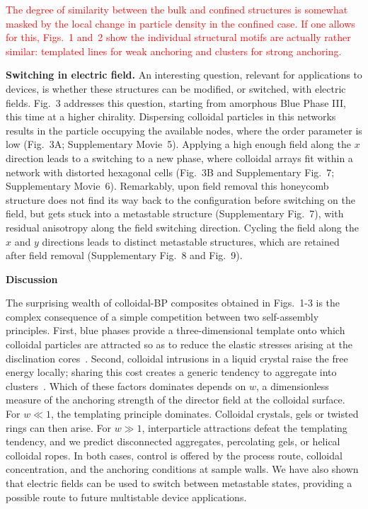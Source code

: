 \documentclass[12pt]{article}
\begin{document}
\textcolor{red}{
The degree of similarity between
the bulk and confined structures is somewhat masked by the local
change in particle density in the confined case. If one allows for
this, Figs.~1 and~2 show the individual structural motifs are actually
rather similar: templated lines for weak anchoring and clusters for
strong anchoring.
}

\medskip
\noindent
\textbf{Switching in electric field.}
An interesting question, relevant for applications to devices, is whether 
these structures can be modified, or switched, with electric fields.
Fig.~3 addresses this question, starting from amorphous Blue Phase III,
this time at a higher chirality. Dispersing colloidal particles in this networks
results in the particle occupying the available nodes, where the order
parameter is low (Fig.~3A; Supplementary Movie~5). Applying a high enough
field 
along the $x$ direction leads to a switching to a new phase, where colloidal 
arrays fit within a network with distorted hexagonal cells (Fig.~3B 
and Supplementary Fig.~7; Supplementary Movie~6). 
Remarkably, upon field removal this honeycomb structure does not find its 
way back to the 
configuration before switching on the field, but gets stuck into a metastable 
structure (Supplementary Fig.~7), with residual anisotropy along the field
switching 
direction. Cycling the field along the $x$ and $y$ directions leads to
distinct metastable structures, which are retained after field removal
(Supplementary Fig.~8 and Fig.~9).

\medskip
\noindent
\textbf{\large Discussion}

\noindent
The surprising wealth of colloidal-BP composites obtained in Figs.~1-3 is
the complex consequence of a simple competition between two self-assembly
principles. 
First, blue phases provide a three-dimensional template onto which
colloidal particles are attracted so as to reduce the elastic stresses
arising at the disclination cores~\cite{miha}. Second, colloidal intrusions
in a liquid crystal raise the free energy locally; sharing this cost creates
a generic tendency to aggregate into clusters~\cite{tiffany}. Which of these
factors dominates depends on $w$, a dimensionless measure of the anchoring
strength of the director field at the colloidal surface. For $w\ll 1$, the
templating principle dominates. Colloidal crystals, gels or twisted rings
can then arise. For $w \gg 1$, interparticle attractions defeat the
templating tendency, and we predict disconnected aggregates, percolating
gels, or helical colloidal ropes. In both cases, control is offered by the
process route, colloidal concentration, and the anchoring conditions at
sample walls. We have also shown that electric fields can be used to
switch between metastable states, providing a possible route to future
multistable device applications.
\end{document}
